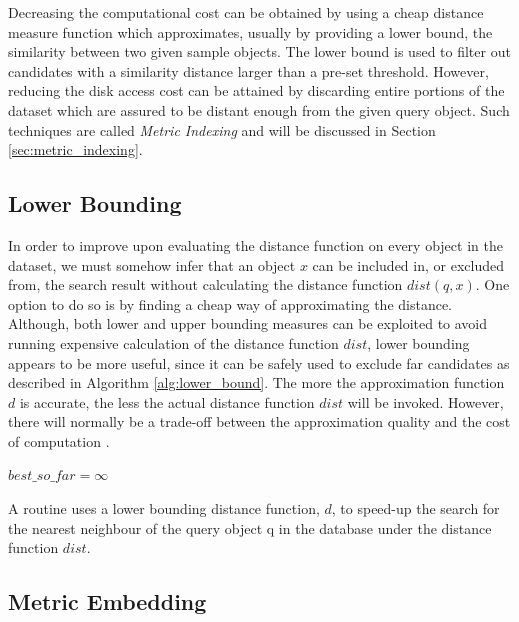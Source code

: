 \iftoggle{edit-mode}{\hspace{0pt}\marginpar{Solution directions}}{}
Decreasing the computational cost can be obtained by using a cheap distance measure function which approximates, usually by providing a lower bound, the similarity between two given sample objects. 
The lower bound is used to filter out candidates with a similarity distance larger than a pre-set threshold. 
However, reducing the disk access cost can be attained by discarding entire portions of the dataset which are assured to be distant enough from the given query object. 
Such techniques are called \emph{Metric Indexing} and will be discussed in Section \ref{sec:metric_indexing}.


\subsection{Lower Bounding}
\label{subsec:lower_bounding}
\iftoggle{edit-mode}{\hspace{0pt}\marginpar{Distance function approximation}}{}
In order to improve upon evaluating the distance function on every object in the dataset, we must somehow infer that an object $x$ can be included in, or excluded from, the search result without calculating the distance function $dist(q, x)$. One option to do so is by finding a cheap way of approximating the distance. Although, both lower and upper bounding measures can be exploited to avoid running expensive calculation of the distance function $dist$, lower bounding appears to be more useful, since it can be safely used to exclude far candidates as described in Algorithm \ref{alg:lower_bound}. The more the approximation function $d$ is accurate, the less the actual distance function $dist$ will be invoked. However, there will normally be a trade-off between the approximation quality and the cost of computation \cite{hetland2009basic, keogh2005exact}.

\begin{algorithm}
$best\_so\_far = \infty$\;
\caption{A routine uses a lower bounding distance function, $d$, to speed-up the search for the nearest neighbour of the query object q in the database under the distance function $dist$.}
\label{alg:lower_bound}
\end{algorithm}

\subsection{Metric Embedding}
\label{subsec:metric_embedding}

